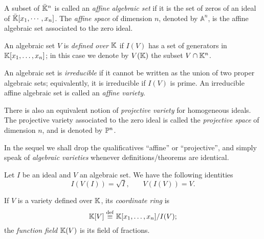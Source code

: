  A subset of $\bar{\mathbb{K}}^n$ is called an
\emph{affine algebraic set} if it is the
set of zeros of an ideal of $\bar{\mathbb{K}}[x_1,\cdots,x_n]$.  The
\emph{affine space} of dimension $n$, denoted by
$\mathbb{A}^n$, is the affine algebraic set associated to the
zero ideal.

An algebraic set $V$ is
\emph{defined over} $\mathbb{K}$ if
$I(V)$ has a set of generators in $\mathbb{K}[x_1,\ldots,x_n]$; in this case
we denote by $V(\mathbb{K})$ the subset $V\cap\mathbb{K}^n$.

An algebraic set is
\emph{irreducible} if it cannot be
written as the union of two proper algebraic sets; equivalently, it is
irreducible if $I(V)$ is prime. An irreducible affine algebraic set is
called an \emph{affine variety}.

There is also an equivalent notion of
\emph{projective
  variety} for homogeneous ideals. The projective variety associated to
the zero ideal is called the \emph{projective
  space} of dimension $n$, and is denoted by
$\mathbb{P}^n$.

In the sequel we shall drop the qualificatives ``affine'' or
``projective'', and simply speak of
\emph{algebraic varieties} whenever
definitions/theorems are identical.


\begin{theorem}[Nullstellensatz]
  Let $I$ be an ideal and $V$ an algebraic set. We have the following
  identities
  \begin{equation}
    \label{eq:217}
    I(V(I)) = \sqrt{I}
    \text{,}\qquad
    V(I(V)) = V
    \text{.}
  \end{equation}
\end{theorem}

If $V$ is a variety defined over $\mathbb{K}$, its
\emph{coordinate
  ring} is
\begin{equation}
  \label{eq:218}
  \mathbb{K}[V] \overset{\mathrm{def}}{\equiv} \mathbb{K}[x_1,\ldots,x_n]/I(V)
  \text{;}
\end{equation}
the \emph{function field}
$\mathbb{K}(V)$ is its field of fractions. 

